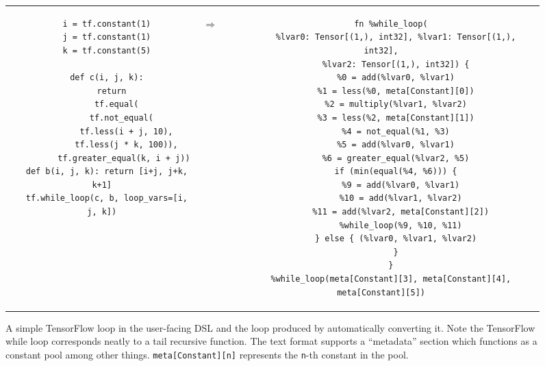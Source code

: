  \begin{figure*}[htb!]
    \begin{tabular}{ccc}
    \begin{minipage}{0.4\textwidth}
    \begin{verbatim}
  i = tf.constant(1)
  j = tf.constant(1)
  k = tf.constant(5)

  def c(i, j, k):
    return
      tf.equal(
        tf.not_equal(
          tf.less(i + j, 10),
          tf.less(j * k, 100)),
         tf.greater_equal(k, i + j))
  def b(i, j, k): return [i+j, j+k, k+1]
  tf.while_loop(c, b, loop_vars=[i, j, k])
    \end{verbatim}
    \end{minipage}
  & \hspace{-2.0em}
  \begin{Huge}
    $\Rightarrow$
  \end{Huge}
  &
    \begin{minipage}{0.5\textwidth}
    \begin{verbatim}
    fn %while_loop(
      %lvar0: Tensor[(1,), int32], %lvar1: Tensor[(1,), int32],
      %lvar2: Tensor[(1,), int32]) {
      %0 = add(%lvar0, %lvar1)
      %1 = less(%0, meta[Constant][0])
      %2 = multiply(%lvar1, %lvar2)
      %3 = less(%2, meta[Constant][1])
      %4 = not_equal(%1, %3)
      %5 = add(%lvar0, %lvar1)
      %6 = greater_equal(%lvar2, %5)
      if (min(equal(%4, %6))) {
        %9 = add(%lvar0, %lvar1)
        %10 = add(%lvar1, %lvar2)
        %11 = add(%lvar2, meta[Constant][2])
        %while_loop(%9, %10, %11)
      } else { (%lvar0, %lvar1, %lvar2)
      }
    }
    %while_loop(meta[Constant][3], meta[Constant][4], meta[Constant][5])
    \end{verbatim}
    \end{minipage}
    \end{tabular}
    \caption{\textmd{
      A simple TensorFlow loop in the user-facing DSL and the \relay
        loop produced by automatically converting it.
      Note the TensorFlow while loop corresponds neatly to a tail recursive
        function.
      The \relay text format supports a ``metadata'' section which functions
        as a constant pool among other things.
      \texttt{meta[Constant][n]} represents the \texttt{n}-th constant in the
        pool.
    }}
    \label{fig:tf_to_relay_loop}
    \end{figure*}

